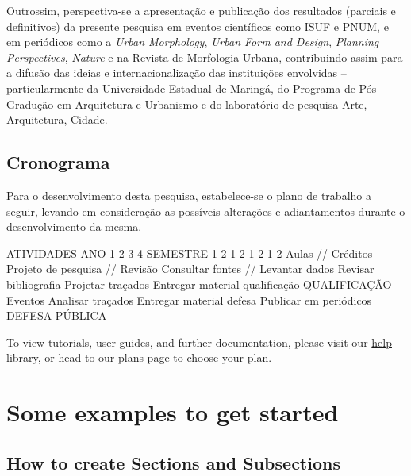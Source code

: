 \documentclass[twoside, 12pt, english,italian,latin,greek,french,spanish,brazil]{book}
\begin{document}
        Outrossim, perspectiva-se a apresentação e publicação dos resultados (parciais e definitivos) da presente pesquisa em eventos científicos como ISUF e PNUM,  e em periódicos como a \textit{Urban Morphology}, \textit{Urban Form and Design}, \textit{Planning Perspectives}, \textit{Nature} e na Revista de Morfologia Urbana, contribuindo assim para a difusão das ideias e internacionalização das instituições envolvidas – particularmente da Universidade Estadual de Maringá, do Programa de Pós-Gradução em Arquitetura e Urbanismo e do laboratório de pesquisa Arte, Arquitetura, Cidade.

    \subsection{Cronograma}

        Para o desenvolvimento desta pesquisa, estabelece-se o plano de trabalho a seguir, levando em consideração as possíveis alterações e adiantamentos durante o desenvolvimento da mesma. 

        ATIVIDADES	ANO	1	2	3	4
	    SEMESTRE	1	2	1	2	1	2	1	2
        Aulas // Créditos	 	 	 	 	 	 	 	 
        Projeto de pesquisa // Revisão	 	 	 	 	 	 	 	 
        Consultar fontes // Levantar dados	 	 	 	 	 	 	 	 
        Revisar bibliografia	 	 	 	 	 	 	 	 
        Projetar traçados	 	 	 	 	 	 	 	 
        Entregar material qualificação	 	 	 	 	 	 	 	 
        QUALIFICAÇÃO	 	 	 	 	 	 	 	 
        Eventos	 	 	 	 	 	 	 	 
        Analisar traçados	 	 	 	 	 	 	 	 
        Entregar material defesa	 	 	 	 	 	 	 	 
        Publicar em periódicos	 	 	 	 	 	 	 	 
        DEFESA PÚBLICA	 	 	 	 	 	 	 	 

\newpage


 To view tutorials, user guides, and further documentation, please visit our \href{https://www.overleaf.com/learn}{help library}, or head to our plans page to \href{https://www.overleaf.com/user/subscription/plans}{choose your plan}.

\section{Some examples to get started}

    \subsection{How to create Sections and Subsections}
\end{document}
